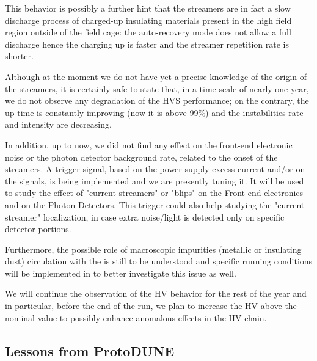 This behavior is possibly a further hint that the streamers are in fact a slow discharge process of charged-up insulating materials present in the high field region outside of the field cage: the auto-recovery mode does not allow a full discharge hence the charging up is faster and the streamer repetition rate is shorter.

Although at the moment we do not have yet a precise knowledge of the origin of the streamers, it is certainly safe to state that, in a time scale of nearly one year, we do not observe any degradation of the HVS performance; on the contrary, the up-time is constantly improving (now it is above 99\%) and the instabilities rate and intensity are decreasing.

In addition, up to now, we did not find any effect on the front-end electronic noise or the photon detector background rate, related to the onset of the streamers. A trigger signal, based on the  power supply excess current and/or on the  signals, is being implemented and we are presently tuning it.  It will be used to study the effect of "current streamers" or "blips"  on the Front end electronics and on the Photon Detectors. This trigger could also help studying the "current streamer" localization, in case extra noise/light is detected only on specific detector portions.

Furthermore, the possible role of macroscopic impurities (metallic or insulating dust) circulation with the  is still to be understood and specific running conditions will be implemented in  to better investigate this issue as well. 

We will continue the observation of the HV behavior for the rest of the year and in particular, before the end of the run, we plan to increase the HV above the nominal value to possibly enhance anomalous effects in the HV chain. 



\subsection{Lessons from ProtoDUNE}


